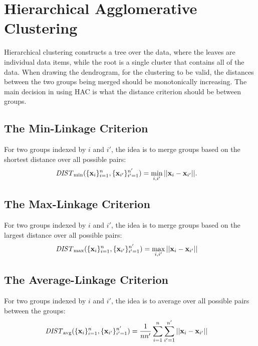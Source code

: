 \documentclass[12pt,letterpaper]{article}
\begin{document}
\section{Hierarchical Agglomerative Clustering}

Hierarchical clustering constructs a tree over the data, where the leaves are individual data items, while the root is a single cluster that contains all of the data. When drawing the dendrogram, for the clustering to be valid, the distances between the two groups being merged should be monotonically increasing. 
The main decision in using
HAC is what the distance criterion should be between groups.

\subsection{The Min-Linkage Criterion}
For two groups indexed by $i$ and $i'$, the idea is to merge groups based on the shortest distance over all possible pairs:
\begin{align*}
	 \mathit{DIST}_{\mathrm{min}}(\{\mathbf{x}_i\}_{i=1}^{n}, \{\mathbf{x}_{i'}\}_{i'=1}^{n'}) &= \min_{i,i'}||\mathbf{x}_i - \mathbf{x}_{i'}||.
\end{align*}

\subsection{The Max-Linkage Criterion}
For two groups indexed by $i$ and $i'$, the idea is to merge groups based on the largest distance over all possible pairs:
\begin{align*}
	 \mathit{DIST}_{\mathrm{max}}(\{\mathbf{x}_i\}_{i=1}^{n}, \{\mathbf{x}_{i'}\}_{i'=1}^{n'})
 &= \max_{i,i'}||\mathbf{x}_i - \mathbf{x}_{i'}||
\end{align*}

\subsection{The Average-Linkage Criterion}
For two groups indexed by $i$ and $i'$, the idea is to average over all possible pairs between the groups:
\begin{align*}
	 \mathit{DIST}_{\mathrm{avg}}(\{\mathbf{x}_i\}_{i=1}^{n}, \{\mathbf{x}_{i'}\}_{i'=1}^{n'})
&= \frac{1}{nn'} \sum_{i=1}^{n} \sum_{i'=1}^{n'} ||\mathbf{x}_i - \mathbf{x}_{i'}||
\end{align*}
\end{document}
